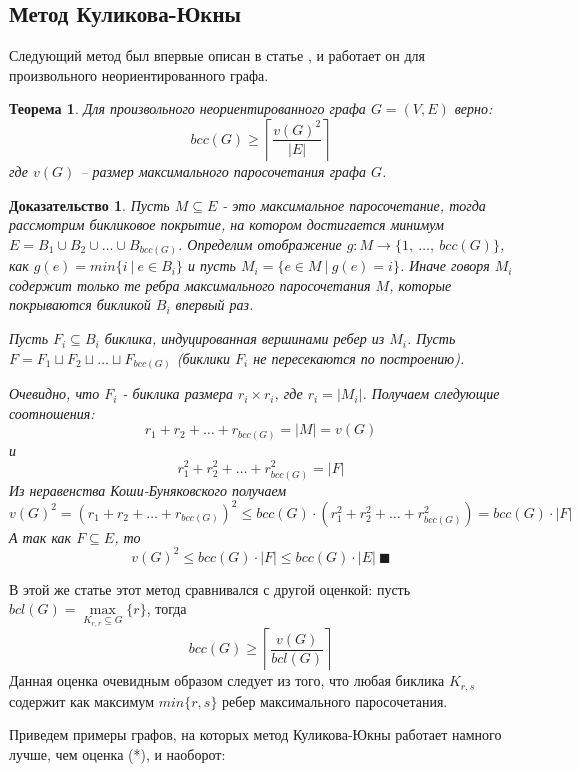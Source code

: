 \documentclass[a4paper]{article}
\newtheorem{mtheorem}{Теорема}[section]
\newtheorem*{msolution}{Доказательство}
\begin{document}
\subsection{Метод Куликова-Юкны}
Следующий метод был впервые описан в статье \cite{KulikovJukna}, и работает он для произвольного 
неориентированного графа.

\begin{mtheorem}
    Для произвольного неориентированного графа $G = (V, E)$ верно: $$bcc(G)\geq \left\lceil\frac{v(G)^2}{|E|}\right\rceil$$ 
    где $v(G)$ -- размер максимального паросочетания графа $G$.
\end{mtheorem}

\begin{msolution}
	Пусть $M\subseteq E$ - это максимальное паросочетание, тогда рассмотрим бикликовое покрытие, 
	на котором достигается минимум $E = B_1\cup B_2\cup \ldots \cup B_{bcc(G)}$. Определим 
	отображение $g:M\rightarrow \{1,\ \ldots,\ bcc(G)\}$, как $g(e) = min\{i\ |\ e\in B_i\}$ и пусть 
	$M_i = \{e\in M\ |\ g(e) = i\}$. Иначе говоря $M_i$ содержит только те ребра максимального 
	паросочетания $M$, которые покрываются бикликой $B_i$ впервый раз.
	
	Пусть $F_i \subseteq B_i$ биклика, индуцированная вершинами ребер из $M_i$. Пусть 
	$F = F_1\sqcup F_2\sqcup \ldots \sqcup F_{bcc(G)}$ (биклики $F_i$ не пересекаются по построению).
	
	Очевидно, что $F_i$ - биклика размера $r_i\times r_i$, где $r_i = |M_i|$. Получаем следующие 
	соотношения: $$r_1 + r_2 + \ldots + r_{bcc(G)} = |M| = v(G)$$ и 
	$$r_1^2 + r_2^2 + \ldots + r_{bcc(G)}^2 = |F|$$ Из неравенства Коши-Буняковского получаем 
	$$v(G)^2 = (r_1 + r_2 + \ldots + r_{bcc(G)})^2 \leq bcc(G)\cdot (r_1^2 + r_2^2 + \ldots + r_{bcc(G)}^2) = bcc(G)\cdot |F|$$
	А так как $F \subseteq E$, то $$v(G)^2\leq bcc(G)\cdot |F| \leq bcc(G)\cdot |E|\ \blacksquare$$

\end{msolution}

В этой же статье \cite{KulikovJukna} этот метод сравнивался с другой оценкой: пусть $bcl(G) = \max\limits_{K_{r,r}\subseteq G}\{r\}$, 
тогда
\[bcc(G) \geq \left\lceil\frac{v(G)}{bcl(G)}\right\rceil \tag{*}\]
Данная оценка очевидным образом следует из того, что любая биклика $K_{r, s}$ содержит как максимум 
$min\{r, s\}$ ребер максимального паросочетания.

Приведем примеры графов, на которых метод Куликова-Юкны работает намного лучше, чем оценка (*), и наоборот:
\end{document}
